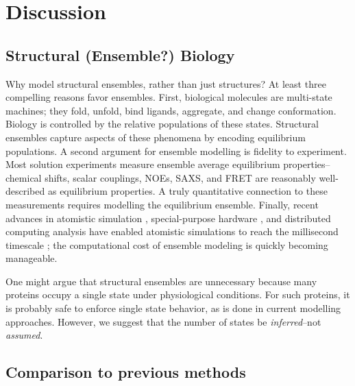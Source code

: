 \documentclass[journal=jacsat,manuscript=article]{achemso}
\begin{document}
\section{Discussion}

\subsection{Structural (Ensemble?) Biology}

Why model structural ensembles, rather than just structures?  At least three compelling reasons favor ensembles.  First, biological molecules are multi-state machines; they fold, unfold, bind ligands, aggregate, and change conformation.  Biology is controlled by the relative populations of these states.  Structural ensembles capture aspects of these phenomena by encoding equilibrium populations.  A second argument for ensemble modelling is fidelity to experiment.  Most solution experiments measure ensemble average equilibrium properties--chemical shifts, scalar couplings, NOEs, SAXS, and FRET are reasonably well-described as equilibrium properties.  A truly quantitative connection to these measurements requires modelling the equilibrium ensemble.  Finally, recent advances in atomistic simulation \cite{hess2008, pronk2013gromacs, eastman2012openmm, eastman2010openmm}, special-purpose hardware \cite{Shaw2008}, and distributed computing analysis \cite{emma, msmb2} have enabled atomistic simulations to reach the 
millisecond 
timescale \cite{voelz2010, bowman2011atomistic, Shaw2010, Shaw2011}; the computational cost of ensemble modeling is quickly becoming manageable.

One might argue that structural ensembles are unnecessary because many proteins occupy a single state under physiological conditions.  For such proteins, it is probably safe to enforce single state behavior, as is done in current modelling approaches. However, we suggest that the number of states be \emph{inferred}--not \emph{assumed}.  

\subsection{Comparison to previous methods}
\end{document}
